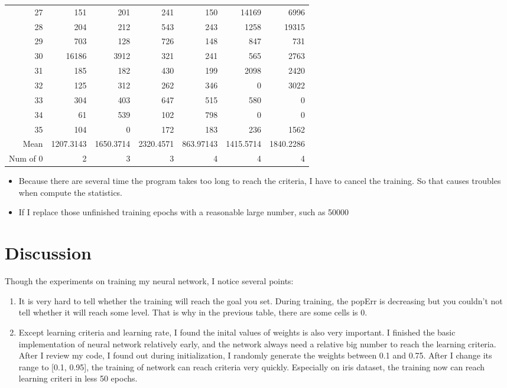 \documentclass[11pt]{article}
\begin{document}
\begin{center}
\begin{tabular}{rrrrrrr}
27 & 151 & 201 & 241 & 150 & 14169 & 6996\\
28 & 204 & 212 & 543 & 243 & 1258 & 19315\\
29 & 703 & 128 & 726 & 148 & 847 & 731\\
30 & 16186 & 3912 & 321 & 241 & 565 & 2763\\
31 & 185 & 182 & 430 & 199 & 2098 & 2420\\
32 & 125 & 312 & 262 & 346 & 0 & 3022\\
33 & 304 & 403 & 647 & 515 & 580 & 0\\
34 & 61 & 539 & 102 & 798 & 0 & 0\\
35 & 104 & 0 & 172 & 183 & 236 & 1562\\
Mean & 1207.3143 & 1650.3714 & 2320.4571 & 863.97143 & 1415.5714 & 1840.2286\\
Num of 0 & 2 & 3 & 3 & 4 & 4 & 4\\
\end{tabular}
\end{center}

\begin{itemize}
\item Because there are several time the program takes too long to reach the criteria, I have to cancel the training. So that causes troubles when compute the statistics.
\item If I replace those unfinished training epochs with a reasonable large number, such as 50000
\end{itemize}



\section{Discussion}
\label{sec-4}
Though the experiments on training my neural network, I notice several points:
\begin{enumerate}
\item It is very hard to tell whether the training will reach the goal you set. During training, the popErr is decreasing but you couldn't not tell whether it will reach some level. That is why in the previous table, there are some cells is 0.
\item Except learning criteria and learning rate, I found the inital values of weights is also very important. I finished the basic implementation of neural network relatively early, and the network always need a relative big number to reach the learning criteria. After I review my code, I found out during initialization, I randomly generate the weights between 0.1 and 0.75. After I change its range to [0.1, 0.95], the training of network can reach criteria very quickly. Especially on iris dataset, the training now can reach learning criteri in less 50 epochs.
\end{enumerate}
\end{document}
